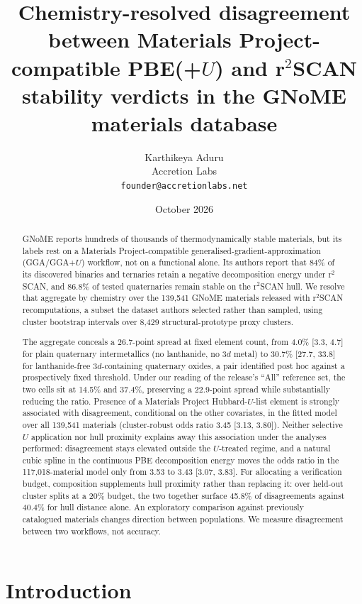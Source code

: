 \documentclass[11pt]{article}
\title{\textbf{Chemistry-resolved disagreement between Materials Project-compatible
PBE(+$U$) and r$^2$SCAN stability verdicts in the GNoME materials database}}
\author{Karthikeya Aduru \\ \small Accretion Labs \\ \small \texttt{founder@accretionlabs.net}}
\date{October 2026}
\begin{document}
\sloppy %
\maketitle

\begin{abstract}
GNoME reports hundreds of thousands of thermodynamically stable materials, but its
labels rest on a Materials Project-compatible generalised-gradient-approximation
(GGA/GGA+$U$) workflow, not on a functional alone. Its authors report that 84\% of its discovered binaries
and ternaries retain a negative decomposition energy under r$^2$SCAN, and 86.8\% of
tested quaternaries remain stable on the r$^2$SCAN hull. We resolve that aggregate by chemistry over the
139{,}541 GNoME materials released with r$^2$SCAN recomputations, a subset the dataset
authors selected rather than sampled, using cluster bootstrap intervals over 8{,}429
structural-prototype proxy clusters.

The aggregate conceals a 26.7-point spread at fixed element count, from 4.0\%
[3.3, 4.7] for plain quaternary intermetallics (no lanthanide, no 3$d$ metal) to 30.7\%
[27.7, 33.8] for lanthanide-free 3$d$-containing quaternary oxides, a pair identified
post hoc against a prospectively
fixed threshold. Under our reading of the release's ``All'' reference set, the two cells sit at
14.5\% and 37.4\%, preserving a 22.9-point spread while
substantially reducing the ratio. Presence of a Materials Project Hubbard-$U$-list element is strongly associated with
disagreement, conditional on the other covariates, in the fitted model over all
139{,}541 materials
(cluster-robust odds ratio 3.45 [3.13, 3.80]). Neither selective $U$ application nor hull proximity explains away this
association under the analyses performed: disagreement stays elevated outside the
$U$-treated regime, and a natural cubic spline in the continuous PBE decomposition energy
moves the odds ratio in the 117{,}018-material model only from 3.53 to 3.43 [3.07, 3.83]. For allocating a
verification budget, composition supplements hull proximity rather than replacing it: over
held-out cluster splits at a 20\% budget, the two together surface 45.8\% of
disagreements against 40.4\% for hull distance alone. An exploratory
comparison against previously catalogued materials changes direction between populations.
We measure
disagreement between two workflows, not accuracy.
\end{abstract}

\section{Introduction}
\end{document}
